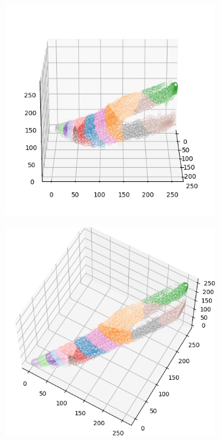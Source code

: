 \begin{figure}[htbp]
\begin{subfigure}[t]{0.32\textwidth}
    \end{subfigure}
    \begin{subfigure}[t]{0.32\textwidth}
        \includegraphics[width=\linewidth]{../../python_code/plots/kmeans/horse-139/clusters_elev20_azim0.png}
    \end{subfigure}
    \begin{subfigure}[t]{0.32\textwidth}
        \includegraphics[width=\linewidth]{../../python_code/plots/kmeans/horse-139/clusters_elev60_azim-60.png}

\end{subfigure}
\end{figure}
